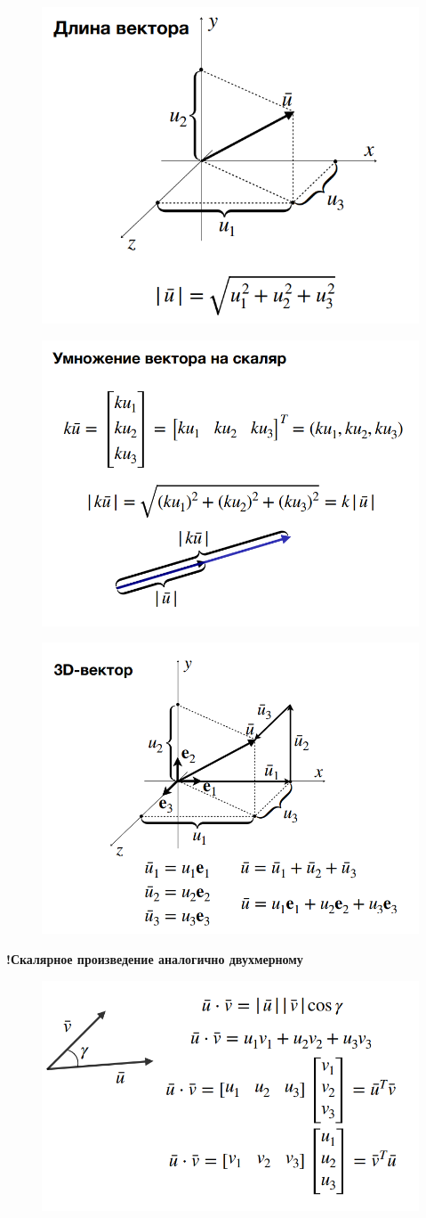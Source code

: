 \documentclass{article}
\begin{document}
\begin{figure} [H]
    \includegraphics[width=0.50\linewidth]{Снимок экрана 2025-03-10 131219.png}
\end{figure}

\begin{figure} [H]
    \includegraphics[width=0.50\linewidth]{Снимок экрана 2025-03-10 131255.png}
\end{figure}


\begin{figure} [H]
    \includegraphics[width=0.50\linewidth]{Снимок экрана 2025-03-10 131408.png}
\end{figure}


\textbf{!Скалярное произведение аналогично двухмерному}


\begin{figure} [H]
    \includegraphics[width=0.50\linewidth]{Снимок экрана 2025-03-10 131719.png}
\end{figure}
\end{document}
